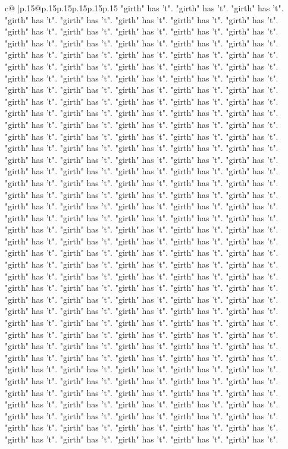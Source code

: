 \documentclass{article}
\begin{document}
{\begin{supertabular}{c@{$\;$}|p{.15\linewidth}@{}p{.15\linewidth}p{.15\linewidth}p{.15\linewidth}p{.15\linewidth}p{.15\linewidth}}
{{{"girth" has 't". "girth" has 't". "girth" has 't". "girth" has 't". "girth" has 't". "girth" has 't". "girth" has 't". "girth" has 't". "girth" has 't". "girth" has 't". "girth" has 't". "girth" has 't". "girth" has 't". "girth" has 't". "girth" has 't". "girth" has 't". "girth" has 't". "girth" has 't". "girth" has 't". "girth" has 't". "girth" has 't". "girth" has 't". "girth" has 't". "girth" has 't". "girth" has 't". "girth" has 't". "girth" has 't". "girth" has 't". "girth" has 't". "girth" has 't". "girth" has 't". "girth" has 't". "girth" has 't". "girth" has 't". "girth" has 't". "girth" has 't". "girth" has 't". "girth" has 't". "girth" has 't". "girth" has 't". "girth" has 't". "girth" has 't". "girth" has 't". "girth" has 't". "girth" has 't". "girth" has 't". "girth" has 't". "girth" has 't". "girth" has 't". "girth" has 't". "girth" has 't". "girth" has 't". "girth" has 't". "girth" has 't". "girth" has 't". "girth" has 't". "girth" has 't". "girth" has 't". "girth" has 't". "girth" has 't". "girth" has 't". "girth" has 't". "girth" has 't". "girth" has 't". "girth" has 't". "girth" has 't". "girth" has 't". "girth" has 't". "girth" has 't". "girth" has 't". "girth" has 't". "girth" has 't". "girth" has 't". "girth" has 't". "girth" has 't". "girth" has 't". "girth" has 't". "girth" has 't". "girth" has 't". "girth" has 't". "girth" has 't". "girth" has 't". "girth" has 't". "girth" has 't". "girth" has 't". "girth" has 't". "girth" has 't". "girth" has 't". "girth" has 't". "girth" has 't". "girth" has 't". "girth" has 't". "girth" has 't". "girth" has 't". "girth" has 't". "girth" has 't". "girth" has 't". "girth" has 't". "girth" has 't". "girth" has 't". "girth" has 't". "girth" has 't". "girth" has 't". "girth" has 't". "girth" has 't". "girth" has 't". "girth" has 't". "girth" has 't". "girth" has 't". "girth" has 't". "girth" has 't". "girth" has 't". "girth" has 't". "girth" has 't". "girth" has 't". "girth" has 't". "girth" has 't". "girth" has 't". "girth" has 't". "girth" has 't". "girth" has 't". "girth" has 't". "girth" has 't". "girth" has 't". "girth" has 't". "girth" has 't". "girth" has 't". "girth" has 't". "girth" has 't". "girth" has 't". "girth" has 't". "girth" has 't". "girth" has 't". "girth" has 't". "girth" has 't". "girth" has 't". "girth" has 't". "girth" has 't". "girth" has 't". "girth" has 't". "girth" has 't". "girth" has 't". "girth" has 't". "girth" has 't". "girth" has 't". "girth" has 't". "girth" has 't". "girth" has 't". "girth" has 't". "girth" has 't". "girth" has 't". "girth" has 't". "girth" has 't". "girth" has 't". "girth" has 't". "girth" has 't". "girth" has 't". "girth" has 't". "girth" has 't". "girth" has 't". "girth" has 't". "girth" has 't". "girth" has 't". "girth" has 't". "girth" has 't". "girth" has 't". "girth" has 't". "girth" has 't". "girth" has 't". "girth" has 't". "girth" has 't". "girth" has 't". "girth" has 't". "girth" has 't". "girth" has 't". "girth" has 't". "girth" has 't". "girth" has 't". "girth" has 't". "girth" has 't". "girth" has 't". "girth" has 't". "girth" has 't". "girth" has 't". "girth" has 't". "girth" has 't". "girth" has 't". "girth" has 't". }}}
\end{supertabular}}
\end{document}
